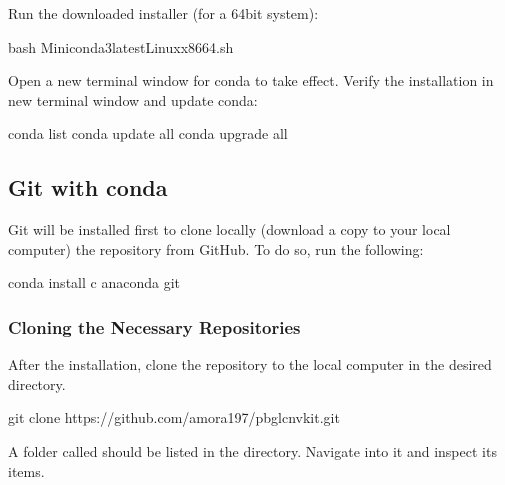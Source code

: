 \documentclass[letterpaper,10pt,english]{sphinxhowto}
\begin{document}
\sphinxAtStartPar
Run the downloaded installer (for a 64\sphinxhyphen{}bit system):

\begin{sphinxVerbatim}[commandchars=\\\{\}]
\PYGZdl{} bash Miniconda3\PYGZhy{}latest\PYGZhy{}Linux\PYGZhy{}x86\PYGZus{}64.sh
\end{sphinxVerbatim}

\sphinxAtStartPar
Open a new terminal window for conda to take effect. Verify the installation in new terminal window and update conda:

\begin{sphinxVerbatim}[commandchars=\\\{\}]
\PYGZdl{} conda list
\PYGZdl{} conda update \PYGZhy{}\PYGZhy{}all
\PYGZdl{} conda upgrade \PYGZhy{}\PYGZhy{}all
\end{sphinxVerbatim}


\subsection{Git with conda}
\label{\detokenize{index:git-with-conda}}
\sphinxAtStartPar
Git will be installed first to clone locally (download a copy to your local computer) the  repository from GitHub. To do so, run the following:

\begin{sphinxVerbatim}[commandchars=\\\{\}]
\PYGZdl{} conda install \PYGZhy{}c anaconda git
\end{sphinxVerbatim}


\subsubsection{Cloning the Necessary Repositories}
\label{\detokenize{index:cloning-the-necessary-repositories}}
\sphinxAtStartPar
After the installation, clone the  repository to the local computer in the desired directory.

\begin{sphinxVerbatim}[commandchars=\\\{\}]
\PYGZdl{} git clone https://github.com/amora197/pbgl\PYGZhy{}cnvkit.git
\end{sphinxVerbatim}

\sphinxAtStartPar
A folder called  should be listed in the directory. Navigate into it and inspect its items.
\end{document}
